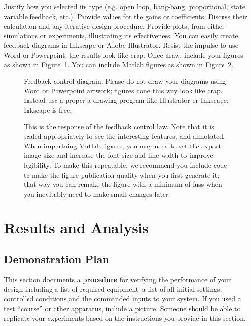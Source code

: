 \documentclass{wsecapstone}
\begin{document}
Justify how you selected its type (e.g.  open loop, bang-bang, proportional, state variable feedback, etc.). Provide values for the gains or coefficients.  Discuss their calculation and any iterative design procedure.  Provide plots, from either simulations or experiments, illustrating its effectiveness.  You can easily create feedback diagrams in Inkscape or Adobe Illustrator.  Resist the impulse to use Word or Powerpoint; the results look like crap. Once draw, include your figures as shown in Figure~\ref{f4}.   You can include Matlab figures as shown in Figure~\ref{f5}.
\begin{figure}
\begin{center}

\end{center}
\caption{Feedback control diagram. Please do not draw your diagrams using Word or Powerpoint artwork; figures done this way look like crap. Instead use a proper a drawing program like Illustrator or Inkscape; Inkscape is free.} 
\label{f4}
\end{figure}
\begin{figure}
\begin{center}

\end{center}
\caption{This is the response of the feedback control law.   Note that it is scaled appropriately to see the interesting features, and annotated.   When importaing Matlab figures, you may need to set the export image size and increase the font size and line width to improve legibility. To make this repeatable, we recommend you include code to make the figure publication-quality when you first generate it; that way you can remake the figure with a minimum of fuss when you inevitably need to make small changes later.}
\label{f5}
\end{figure}





\section{Results and Analysis}

\subsection{Demonstration Plan}
This section documents a \textbf{procedure} for verifying the performance of your design including a list of required equipment, a list of all initial settings, controlled conditions and the commanded inputs to your system. If you used a test “course” or other apparatus, include a picture.  Someone should be able to replicate your experiments based on the instructions you provide in this section.  
\end{document}
